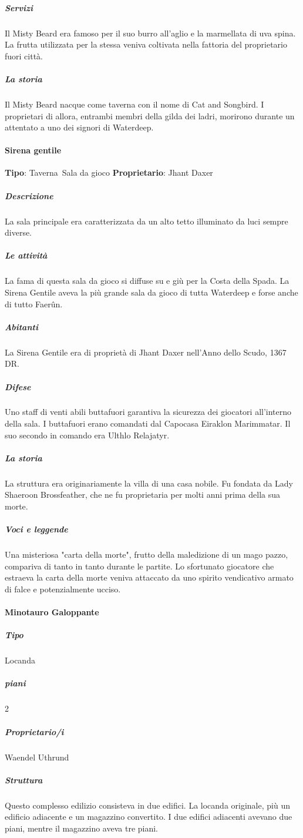\documentclass{article}
\begin{document}
\subparagraph{Servizi}
Il Misty Beard era famoso per il suo burro all'aglio e la marmellata di uva spina. La frutta utilizzata per la stessa veniva coltivata nella fattoria del proprietario fuori città.

\subparagraph{La storia}
Il Misty Beard nacque come taverna con il nome di Cat and Songbird. I proprietari di allora, entrambi membri della gilda dei ladri, morirono durante un attentato a uno dei signori di Waterdeep.
\paragraph{Sirena gentile}
\textbf{Tipo}: Taverna\ Sala da gioco
\textbf{Proprietario}: Jhant Daxer

\subparagraph{Descrizione}
La sala principale era caratterizzata da un alto tetto illuminato da luci sempre diverse.

\subparagraph{Le attività}
La fama di questa sala da gioco si diffuse su e giù per la Costa della Spada. La Sirena Gentile aveva la più grande sala da gioco di tutta Waterdeep e forse anche di tutto Faerûn.

\subparagraph{Abitanti}
La Sirena Gentile era di proprietà di Jhant Daxer nell'Anno dello Scudo, 1367 DR.

\subparagraph{Difese}
Uno staff di venti abili buttafuori garantiva la sicurezza dei giocatori all'interno della sala. I buttafuori erano comandati dal Capocasa Eiraklon Marimmatar. Il suo secondo in comando era Ulthlo Relajatyr.

\subparagraph{La storia}
La struttura era originariamente la villa di una casa nobile. Fu fondata da Lady Shaeroon Brossfeather, che ne fu proprietaria per molti anni prima della sua morte.
\subparagraph{Voci e leggende}
Una misteriosa "carta della morte", frutto della maledizione di un mago pazzo, compariva di tanto in tanto durante le partite. Lo sfortunato giocatore che estraeva la carta della morte veniva attaccato da uno spirito vendicativo armato di falce e potenzialmente ucciso.
\paragraph{Minotauro Galoppante}

\subparagraph{Tipo}
Locanda

\subparagraph{ piani}
2


\subparagraph{Proprietario/i}
Waendel Uthrund



\subparagraph{Struttura}
Questo complesso edilizio consisteva in due edifici. La locanda originale, più un edificio adiacente e un magazzino convertito. I due edifici adiacenti avevano due piani, mentre il magazzino aveva tre piani.
\end{document}
